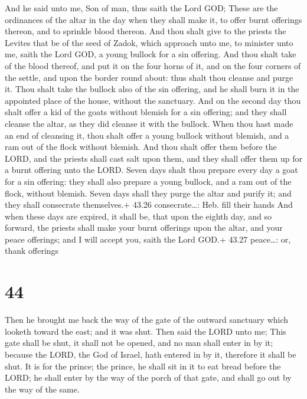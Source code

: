  And he said unto me, Son of man, thus saith the Lord
GOD; These are the ordinances of the altar in the day when they shall
make it, to offer burnt offerings thereon, and to sprinkle blood
thereon.  And thou shalt give to the priests the Levites
that be of the seed of Zadok, which approach unto me, to minister unto
me, saith the Lord GOD, a young bullock for a sin offering.
 And thou shalt take of the blood thereof, and put it on
the four horns of it, and on the four corners of the settle, and upon
the border round about: thus shalt thou cleanse and purge it.
 Thou shalt take the bullock also of the sin offering, and
he shall burn it in the appointed place of the house, without the
sanctuary.  And on the second day thou shalt offer a kid of
the goats without blemish for a sin offering; and they shall cleanse the
altar, as they did cleanse it with the bullock.  When thou
hast made an end of cleansing it, thou shalt offer a young bullock
without blemish, and a ram out of the flock without blemish.
 And thou shalt offer them before the LORD, and the priests
shall cast salt upon them, and they shall offer them up for a burnt
offering unto the LORD.  Seven days shalt thou prepare
every day a goat for a sin offering: they shall also prepare a young
bullock, and a ram out of the flock, without blemish. 
Seven days shall they purge the altar and purify it; and they shall
consecrate themselves.+ 43.26 consecrate\ldots: Heb. fill their hands
 And when these days are expired, it shall be, that upon
the eighth day, and so forward, the priests shall make your burnt
offerings upon the altar, and your peace offerings; and I will accept
you, saith the Lord GOD.+ 43.27 peace\ldots: or, thank offerings

\hypertarget{section-43}{%
\section{44}\label{section-43}}

 Then he brought me back the way of the gate of the outward
sanctuary which looketh toward the east; and it was shut. 
Then said the LORD unto me; This gate shall be shut, it shall not be
opened, and no man shall enter in by it; because the LORD, the God of
Israel, hath entered in by it, therefore it shall be shut. 
It is for the prince; the prince, he shall sit in it to eat bread before
the LORD; he shall enter by the way of the porch of that gate, and shall
go out by the way of the same.

